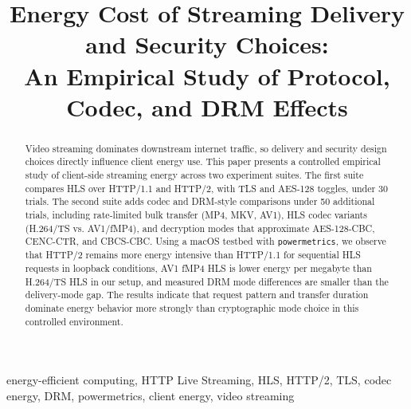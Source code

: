 \documentclass[conference]{IEEEtran}
\begin{document}
\title{Energy Cost of Streaming Delivery and Security Choices:\\
An Empirical Study of Protocol, Codec, and DRM Effects}

\author{
\and
{}
}

\maketitle

\begin{abstract}
Video streaming dominates downstream internet traffic, so delivery and security design
choices directly influence client energy use. This paper presents a controlled empirical
study of client-side streaming energy across two experiment suites. The first suite
compares HLS over HTTP/1.1 and HTTP/2, with TLS and AES-128 toggles, under 30 trials.
The second suite adds codec and DRM-style comparisons under 50 additional trials,
including rate-limited bulk transfer (MP4, MKV, AV1), HLS codec variants (H.264/TS vs.
AV1/fMP4), and decryption modes that approximate AES-128-CBC, CENC-CTR, and CBCS-CBC.
Using a macOS testbed with \texttt{powermetrics}, we observe that HTTP/2 remains more
energy intensive than HTTP/1.1 for sequential HLS requests in loopback conditions, AV1
fMP4 HLS is lower energy per megabyte than H.264/TS HLS in our setup, and measured DRM
mode differences are smaller than the delivery-mode gap. The results indicate that request
pattern and transfer duration dominate energy behavior more strongly than cryptographic
mode choice in this controlled environment.
\end{abstract}

\begin{IEEEkeywords}
energy-efficient computing, HTTP Live Streaming, HLS, HTTP/2, TLS, codec energy, DRM,
powermetrics, client energy, video streaming
\end{IEEEkeywords}
\end{document}
